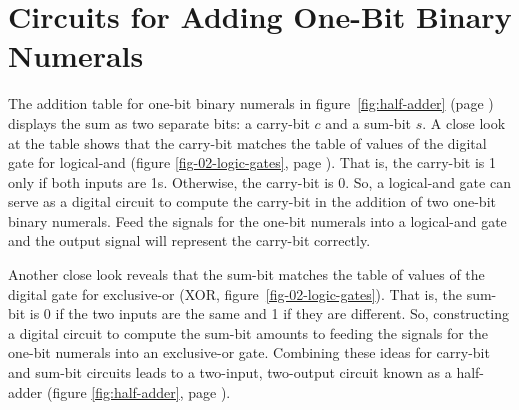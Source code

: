 \begin{exercises}

\end{exercises}

\section{Circuits for Adding One-Bit Binary Numerals}
\label{sec:adding-1-bit-numerals}

The addition table for one-bit binary numerals
in figure~\ref{fig:half-adder} (page \pageref{fig:half-adder})
displays the sum as two separate bits:
a carry-bit $c$ and a sum-bit $s$.
A close look at the table shows that
the carry-bit matches the table of values of the
digital gate for logical-and
(figure \ref{fig-02-logic-gates}, page \pageref{fig-02-logic-gates}).
That is, the carry-bit is 1 only if both inputs are 1s.
Otherwise, the carry-bit is 0.
So, a logical-and gate can serve
as a digital circuit to compute the carry-bit
in the addition of two one-bit binary numerals.
Feed the signals for the one-bit numerals
into a logical-and gate and the output signal
will represent the carry-bit correctly.

Another close look reveals that the sum-bit
matches the table of values of the
digital gate for exclusive-or
(XOR, figure~\ref{fig-02-logic-gates}).
That is, the sum-bit is 0 if the two inputs are the same
and 1 if they are different.
So, constructing a digital circuit to compute the sum-bit
amounts to feeding the signals for the one-bit numerals
into an exclusive-or gate.
Combining these ideas for carry-bit and sum-bit circuits
leads to a two-input, two-output circuit known as a
half-adder (figure \ref{fig:half-adder}, page \pageref{fig:half-adder}).


